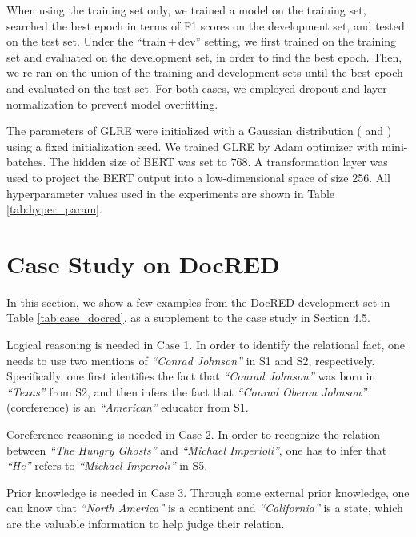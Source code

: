 \documentclass[11pt,a4paper]{article}
\begin{document}
When using the training set only, we trained a model on the training set, searched the best epoch in terms of F1 scores on the development set, and tested on the test set. Under the ``train\,+\,dev'' setting, we first trained on the training set and evaluated on the development set, in order to find the best epoch. Then, we re-ran on the union of the training and development sets until the best epoch and evaluated on the test set.
For both cases, we employed dropout and layer normalization \cite{ba2016layer} to prevent model overfitting. 

The parameters of GLRE were initialized with a Gaussian distribution ( and ) using a fixed initialization seed. We trained GLRE by Adam optimizer \citep{kingma2015adam} with mini-batches. The hidden size of BERT was set to 768. A transformation layer was used to project the BERT output into a low-dimensional space of size 256. All hyperparameter values used in the experiments are shown in Table \ref{tab:hyper_param}.


\section{Case Study on DocRED}

In this section, we show a few examples from the DocRED development set in Table \ref{tab:case_docred}, as a supplement to the case study in Section 4.5.
\begin{compactenum}[(1)]
\item Logical reasoning is needed in Case 1. In order to identify the relational fact, one needs to use two mentions of \textit{``Conrad Johnson''} in S1 and S2, respectively. Specifically, one first identifies the fact that \textit{``Conrad Johnson''} was born in \textit{``Texas''} from S2, and then infers the fact that \textit{``Conrad Oberon Johnson''} (coreference) is an \textit{``American''} educator from S1. 

\item Coreference reasoning is needed in Case 2. In order to recognize the relation between \textit{``The Hungry Ghosts''} and \textit{``Michael Imperioli''}, one has to infer that \textit{``He''} refers to \textit{``Michael Imperioli''} in S5.

\item Prior knowledge is needed in Case 3. Through some external prior knowledge, one can know that \textit{``North America''} is a continent and \textit{``California''} is a state, which are the valuable information to help judge their relation. 
\end{compactenum}
\end{document}
